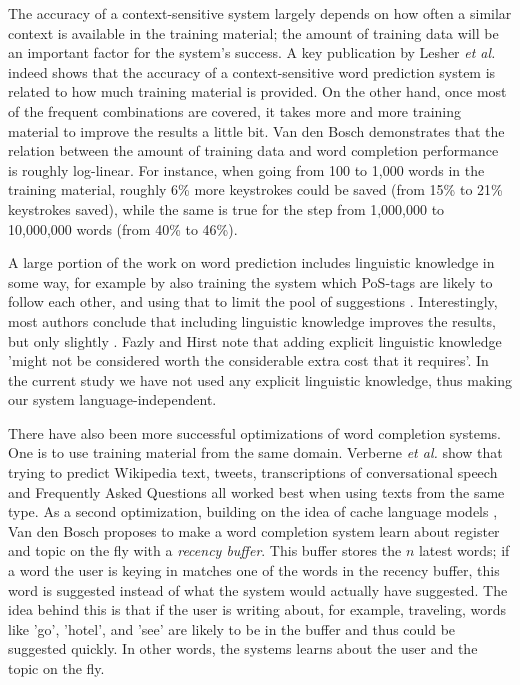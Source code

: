 \documentclass[11pt]{article}
\begin{document}
The accuracy of a context-sensitive system largely depends on how often a similar context is available in the training material; the amount of training data will be an important factor for the system's success. A key publication by Lesher {\em et al.}  indeed shows that the accuracy of a context-sensitive word prediction system is related to how much training material is provided. On the other hand, once most of the frequent combinations are covered, it takes more and more training material to improve the results a little bit. Van den Bosch  demonstrates that the relation between the amount of training data and word completion performance is roughly log-linear. For instance, when going from 100 to 1,000 words in the training material, roughly 6\% more keystrokes could be saved (from 15\% to 21\% keystrokes saved), while the same is true for the step from 1,000,000 to 10,000,000 words (from 40\% to 46\%).

A large portion of the work on word prediction includes linguistic knowledge in some way, for example by also training the system which PoS-tags are likely to follow each other, and using that to limit the pool of suggestions \cite{carlberger+97,Fazly+03,copestake97,Matiasek+02,garay-vitoria+97}. Interestingly, most authors conclude that including linguistic knowledge improves the results, but only slightly \cite{garay-vitoria+97,Fazly+03}. Fazly and Hirst  note that adding explicit linguistic knowledge 'might not be considered worth the considerable extra cost that it requires'. In the current study we have not used any explicit linguistic knowledge, thus making our system language-independent.

There have also been more successful optimizations of word completion systems. One is to use training material from the same domain. Verberne {\em et al.}  show that trying to predict Wikipedia text, tweets, transcriptions of conversational speech and Frequently Asked Questions all worked best when using texts from the same type. 
As a second optimization, building on the idea of cache language models \cite{Goodman01}, Van den Bosch  proposes to make a word completion system learn about register and topic on the fly with a \emph{recency buffer}. This buffer stores the $n$ latest words; if a word the user is keying in matches one of the words in the recency buffer, this word is suggested instead of what the system would actually have suggested. The idea behind this is that if the user is writing about, for example, traveling, words like 'go', 'hotel', and 'see' are likely to be in the buffer and thus could be suggested quickly. In other words, the systems learns about the user and the topic on the fly.
\end{document}
